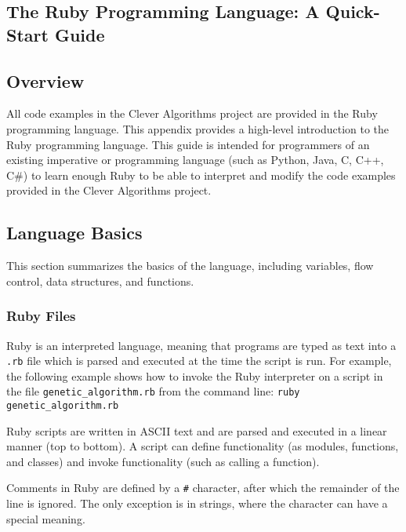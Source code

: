 

\begin{bibunit}
\chapter{The Ruby Programming Language: A Quick-Start Guide}
\label{ch:appendix1}

\section*{Overview}
All code examples in the Clever Algorithms project are provided in the Ruby programming language.
This appendix provides a high-level introduction to the Ruby programming language. This guide is intended for programmers of an existing imperative or programming language (such as Python, Java, C, C++, C\#) to learn enough Ruby to be able to interpret and modify the code examples provided in the Clever Algorithms project.

\section*{Language Basics}
This section summarizes the basics of the language, including variables, flow control, data structures, and functions.

\subsection{Ruby Files}
Ruby is an interpreted language, meaning that programs are typed as text into a \texttt{.rb} file which is parsed and executed at the time the script is run. For example, the following example shows how to invoke the Ruby interpreter on a script in the file \texttt{genetic\_algorithm.rb} from the command line: \texttt{ruby genetic\_algorithm.rb}

Ruby scripts are written in ASCII text and are parsed and executed in a linear manner (top to bottom). A script can define functionality (as modules, functions, and classes) and invoke functionality (such as calling a function). 

Comments in Ruby are defined by a \texttt{\#} character, after which the remainder of the line is ignored. The only exception is in strings, where the character can have a special meaning.


\end{bibunit}
